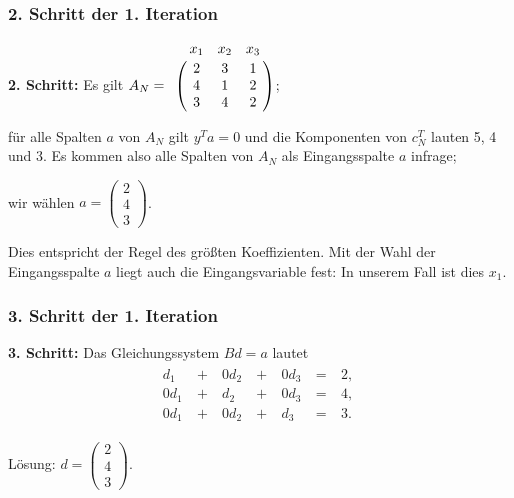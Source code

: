 \documentclass[smaller]{beamer}
\begin{document}
\begin{frame}
 \frametitle{2. Schritt der 1. Iteration}
 {\textbf{2. Schritt:}} Es gilt $A_N = \bordermatrix{ & x_1 & x_2 & x_3 \cr & 2 & 3 & 1 \cr & 4 & 1 & 2 \cr & 3 & 4 & 2}$; \\ \vspace*{0.2cm}
 
 für alle Spalten $a$ von $A_N$ gilt $y^Ta = 0$ und die Komponenten von $c_N^T$ lauten 5, 4 und 3. Es kommen also \alert{alle Spalten} von $A_N$ als Eingangsspalte $a$ infrage;\\ \vspace*{0.2cm}
 
 wir wählen $a = \begin{pmatrix} 2 \\ 4 \\ 3 \end{pmatrix}$.\\ \vspace*{0.2cm}
 
 Dies entspricht der Regel des größten Koeffizienten. Mit der Wahl der Eingangsspalte $a$ liegt auch die Eingangsvariable fest: In unserem Fall ist dies $x_1$.
\end{frame}

\begin{frame}
 \frametitle{3. Schritt der 1. Iteration}
 {\textbf{3. Schritt:}} Das Gleichungssystem $Bd=a$ lautet
\begin{align*}
\begin{alignedat}{4}
 d_1 &\ + &\ 0d_2 &\ + &\ 0d_3 &\ = &\ 2,\ \\
0d_1 &\ + &\  d_2 &\ + &\ 0d_3 &\ = &\ 4,\ \\
0d_1 &\ + &\ 0d_2 &\ + &\  d_3 &\ = &\ 3.\ 
\end{alignedat}
\end{align*}

Lösung: $d = \begin{pmatrix} 2 \\ 4 \\ 3 \end{pmatrix}$.
 
\end{frame}
\end{document}
